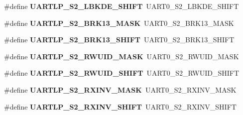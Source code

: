 \begin{DoxyCompactItemize}
\#define {\bfseries U\+A\+R\+T\+L\+P\+\_\+\+S2\+\_\+\+L\+B\+K\+D\+E\+\_\+\+S\+H\+I\+FT}~U\+A\+R\+T0\+\_\+\+S2\+\_\+\+L\+B\+K\+D\+E\+\_\+\+S\+H\+I\+FT
\item 
\mbox{\label{group___backward___compatibility___symbols_ga4ae8233f1781ea7dc494fc5eff1262df}} 
\#define {\bfseries U\+A\+R\+T\+L\+P\+\_\+\+S2\+\_\+\+B\+R\+K13\+\_\+\+M\+A\+SK}~U\+A\+R\+T0\+\_\+\+S2\+\_\+\+B\+R\+K13\+\_\+\+M\+A\+SK
\item 
\mbox{\label{group___backward___compatibility___symbols_ga43368a6f820ea82d1ee803cf7e94c5b1}} 
\#define {\bfseries U\+A\+R\+T\+L\+P\+\_\+\+S2\+\_\+\+B\+R\+K13\+\_\+\+S\+H\+I\+FT}~U\+A\+R\+T0\+\_\+\+S2\+\_\+\+B\+R\+K13\+\_\+\+S\+H\+I\+FT
\item 
\mbox{\label{group___backward___compatibility___symbols_ga467467c8bbe352103ff116334710d766}} 
\#define {\bfseries U\+A\+R\+T\+L\+P\+\_\+\+S2\+\_\+\+R\+W\+U\+I\+D\+\_\+\+M\+A\+SK}~U\+A\+R\+T0\+\_\+\+S2\+\_\+\+R\+W\+U\+I\+D\+\_\+\+M\+A\+SK
\item 
\mbox{\label{group___backward___compatibility___symbols_ga21655fc24718467c5c7a3a17491ab20c}} 
\#define {\bfseries U\+A\+R\+T\+L\+P\+\_\+\+S2\+\_\+\+R\+W\+U\+I\+D\+\_\+\+S\+H\+I\+FT}~U\+A\+R\+T0\+\_\+\+S2\+\_\+\+R\+W\+U\+I\+D\+\_\+\+S\+H\+I\+FT
\item 
\mbox{\label{group___backward___compatibility___symbols_ga5851ca00d46976a2bb09420d5ea14ce0}} 
\#define {\bfseries U\+A\+R\+T\+L\+P\+\_\+\+S2\+\_\+\+R\+X\+I\+N\+V\+\_\+\+M\+A\+SK}~U\+A\+R\+T0\+\_\+\+S2\+\_\+\+R\+X\+I\+N\+V\+\_\+\+M\+A\+SK
\item 
\mbox{\label{group___backward___compatibility___symbols_gafad67c9021f86de6c0d08f8c72457a26}} 
\#define {\bfseries U\+A\+R\+T\+L\+P\+\_\+\+S2\+\_\+\+R\+X\+I\+N\+V\+\_\+\+S\+H\+I\+FT}~U\+A\+R\+T0\+\_\+\+S2\+\_\+\+R\+X\+I\+N\+V\+\_\+\+S\+H\+I\+FT
\item 
\mbox{\label{group___backward___compatibility___symbols_ga41b1656314af8d525f36c119201f43a6}} 

\end{DoxyCompactItemize}
